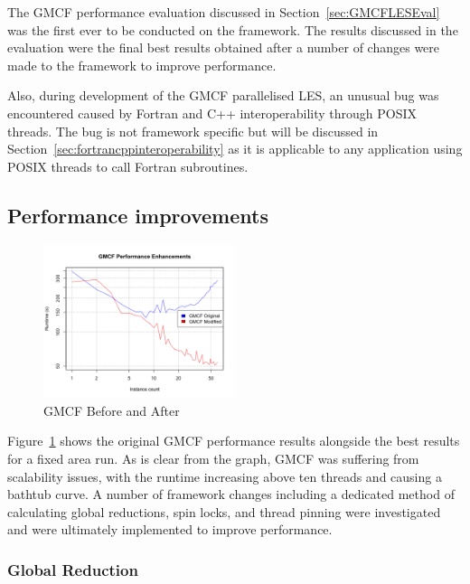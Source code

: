 The GMCF performance evaluation discussed in Section~\ref{sec:GMCFLESEval} was
the first ever to be conducted on the framework. The results discussed in the
evaluation were the final best results obtained after a number of changes were
made to the framework to improve performance.

Also, during development of the GMCF parallelised LES, an unusual bug was
encountered caused by Fortran and C++ interoperability through POSIX threads.
The bug is not framework specific but will be discussed in
Section~\ref{sec:fortrancppinteroperability} as it is applicable to any
application using POSIX threads to call Fortran subroutines.

\subsection{Performance improvements}

\begin{figure}
    \includegraphics[width=0.5\textwidth]
    {graphs/GMCF-before-after-fixed-area.png}
    \caption{GMCF Before and After}
    \label{fig:gmcfbeforeandafter}
\end{figure}

Figure~\ref{fig:gmcfbeforeandafter} shows the original GMCF performance results
alongside the best results for a fixed area run. As is clear from the graph,
GMCF was suffering from scalability issues, with the runtime increasing above
ten threads and causing a bathtub curve. A number of framework changes including
a dedicated method of calculating global reductions, spin locks, and thread
pinning were investigated and were ultimately implemented to improve
performance.

\subsubsection{Global Reduction}

